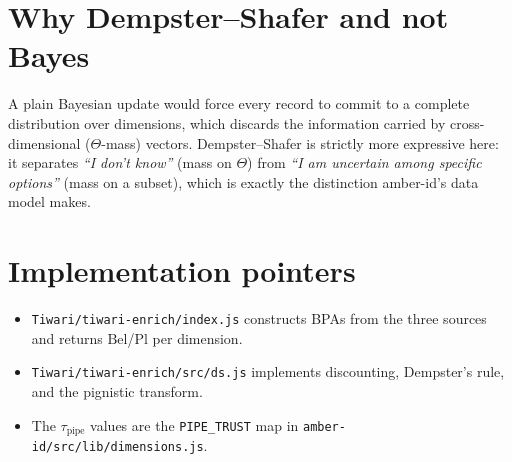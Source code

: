 \documentclass[11pt]{article}
\begin{document}
\section{Why Dempster--Shafer and not Bayes}

A plain Bayesian update would force every record to commit to a
complete distribution over dimensions, which discards the information
carried by cross-dimensional ($\Theta$-mass) vectors. Dempster--Shafer
is strictly more expressive here: it separates
\emph{``I don't know''} (mass on $\Theta$) from
\emph{``I am uncertain among specific options''} (mass on a subset),
which is exactly the distinction amber-id's data model makes.

\section*{Implementation pointers}

\begin{itemize}
\item \texttt{Tiwari/tiwari-enrich/index.js} constructs BPAs from
      the three sources and returns $\mathrm{Bel}$/$\mathrm{Pl}$ per
      dimension.
\item \texttt{Tiwari/tiwari-enrich/src/ds.js} implements discounting,
      Dempster's rule, and the pignistic transform.
\item The $\tau_{\text{pipe}}$ values are the
      \texttt{PIPE\_TRUST} map in
      \texttt{amber-id/src/lib/dimensions.js}.
\end{itemize}
\end{document}
